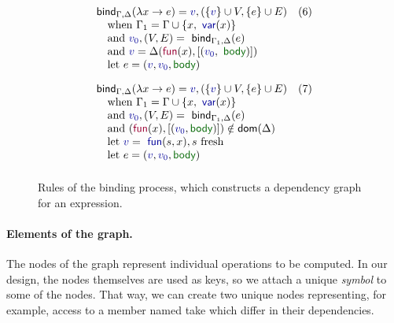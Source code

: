 \documentclass[sigplan,10pt]{acmart}\settopmatter{printfolios=true,printccs=false,printacmref=false}
\theoremstyle{plain}
\theoremstyle{definition}
\newcommand{\ident}[1]{\textnormal{\sffamily #1}}
\newcommand{\bndclr}[1]{\textcolor{kvdclr}{#1}}
\newcommand{\bnd}[1]{\textnormal{\textcolor{kvdclr}{\sffamily #1}}}
\newcommand{\bknd}[1]{\textnormal{\textcolor{prepclr}{\sffamily #1}}}
\newcommand{\blbl}[1]{\textnormal{\textcolor{numclr}{\sffamily #1}}}
\begin{document}
\begin{figure}[t]
\begin{equation*}
\begin{array}{ll}
\\[1em]
\ident{bind}_{\Gamma, \Delta}(\lambda x \rightarrow e) = \bndclr{v}, (\{\bndclr{v}\} \cup V, \{e\} \cup E)&(6)\\
\quad \textnormal{when}~\Gamma_1 = \Gamma \cup \{ x, \bnd{var}(x) \}\\
\quad \textnormal{and}~\bndclr{v_0}, (V, E) = \ident{bind}_{\Gamma_1, \Delta}(e)\\
\quad \textnormal{and}~\bndclr{v} = \Delta(\bknd{fun}(x),[(\bndclr{v_0}, \blbl{body})])\\
\quad \textnormal{let}~e = (\bndclr{v}, \bndclr{v_0}, \blbl{body}) 
\\[1em]
\ident{bind}_{\Gamma, \Delta}(\lambda x \rightarrow e) = \bndclr{v}, (\{\bndclr{v}\} \cup V, \{e\} \cup E)&(7)\\
\quad \textnormal{when}~\Gamma_1 = \Gamma \cup \{ x, \bnd{var}(x) \}\\
\quad \textnormal{and}~\bndclr{v_0}, (V, E) = \ident{bind}_{\Gamma_1, \Delta}(e)\\
\quad \textnormal{and}~(\bknd{fun}(x),[(\bndclr{v_0}, \blbl{body})])\notin \ident{dom}(\Delta)\\
\quad \textnormal{let}~\bndclr{v} = \bnd{fun}(s, x), s~\textnormal{fresh}\\
\quad \textnormal{let}~e = (\bndclr{v},\bndclr{v_0},\blbl{body}) 
\\[0.5em]
\end{array}
\end{equation*}
\vspace{-0.5em}
\caption{Rules of the binding process, which constructs a dependency graph for an expression.}
\label{fig:binding-rules}
\end{figure}

\paragraph{Elements of the graph.} The nodes of the graph represent individual operations
to be computed. In our design, the nodes themselves are used as keys, so we attach a unique 
\emph{symbol} to some of the nodes. That way, we can create two unique nodes representing, 
for example, access to a member named \ident{take} which differ in their dependencies.
\end{document}
